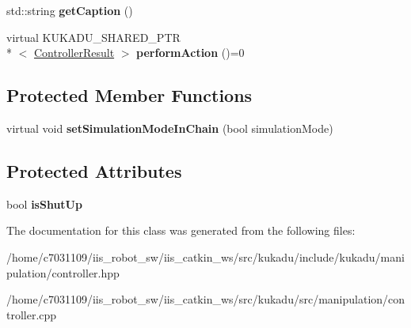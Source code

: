 \begin{DoxyCompactItemize}
\item 
\hypertarget{classkukadu_1_1Controller_aae1903e89a3af93030bd85cb6baac366}{std\-::string {\bfseries get\-Caption} ()}\label{classkukadu_1_1Controller_aae1903e89a3af93030bd85cb6baac366}

\item 
\hypertarget{classkukadu_1_1Controller_a76ce3ce9867173f014561c0bf28fa69f}{virtual K\-U\-K\-A\-D\-U\-\_\-\-S\-H\-A\-R\-E\-D\-\_\-\-P\-T\-R\\*
$<$ \hyperlink{classkukadu_1_1ControllerResult}{Controller\-Result} $>$ {\bfseries perform\-Action} ()=0}\label{classkukadu_1_1Controller_a76ce3ce9867173f014561c0bf28fa69f}

\end{DoxyCompactItemize}
\subsection*{Protected Member Functions}
\begin{DoxyCompactItemize}
\item 
\hypertarget{classkukadu_1_1Controller_a07c70a71d6028cb711567d55e2010430}{virtual void {\bfseries set\-Simulation\-Mode\-In\-Chain} (bool simulation\-Mode)}\label{classkukadu_1_1Controller_a07c70a71d6028cb711567d55e2010430}

\end{DoxyCompactItemize}
\subsection*{Protected Attributes}
\begin{DoxyCompactItemize}
\item 
\hypertarget{classkukadu_1_1Controller_abeb3dd890d6f8d50306b1b8f9d6b5512}{bool {\bfseries is\-Shut\-Up}}\label{classkukadu_1_1Controller_abeb3dd890d6f8d50306b1b8f9d6b5512}

\end{DoxyCompactItemize}


The documentation for this class was generated from the following files\-:\begin{DoxyCompactItemize}
\item 
/home/c7031109/iis\-\_\-robot\-\_\-sw/iis\-\_\-catkin\-\_\-ws/src/kukadu/include/kukadu/manipulation/controller.\-hpp\item 
/home/c7031109/iis\-\_\-robot\-\_\-sw/iis\-\_\-catkin\-\_\-ws/src/kukadu/src/manipulation/controller.\-cpp\end{DoxyCompactItemize}
